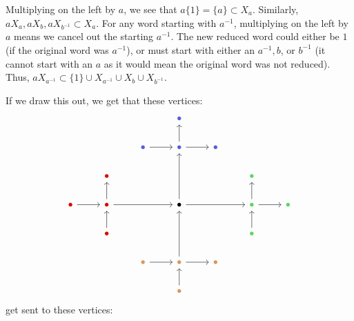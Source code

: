Multiplying on the left by $a$, we see that $a\{1\} = \{a\} \subset X_a$. Similarly, $aX_a, aX_b, aX_{b^{-1}} \subset X_a$. For any word starting with $a^{-1}$, multiplying on the left by $a$ means we cancel out the starting $a^{-1}$. The new reduced word could either be $1$ (if the original word was $a^{-1}$), or must start with either an $a^{-1}, b$, or $b^{-1}$ (it cannot start with an $a$ as it would mean the original word was not reduced). Thus, $aX_{a^{-1}} \subset \{1\} \cup X_{a^{-1}} \cup X_b \cup X_{b^{-1}}$. 

If we draw this out, we get that these vertices: 
\[\begin{tikzcd}
	&&& \textcolor{rgb,255:red,92;green,92;blue,214}{\bullet} &&& \\
	&& \textcolor{rgb,255:red,92;green,92;blue,214}{\bullet} & \textcolor{rgb,255:red,92;green,92;blue,214}{\bullet} & \textcolor{rgb,255:red,92;green,92;blue,214}{\bullet} \\
	& \textcolor{rgb,255:red,224;green,7;blue,0}{\bullet} &&&& \textcolor{rgb,255:red,92;green,214;blue,92}{\bullet} \\
	\textcolor{rgb,255:red,224;green,7;blue,0}{\bullet} & \textcolor{rgb,255:red,224;green,7;blue,0}{\bullet} && \bullet && \textcolor{rgb,255:red,92;green,214;blue,92}{\bullet} & \textcolor{rgb,255:red,92;green,214;blue,92}{\bullet} \\
	& \textcolor{rgb,255:red,224;green,7;blue,0}{\bullet} &&&& \textcolor{rgb,255:red,92;green,214;blue,92}{\bullet} \\
	&& \textcolor{rgb,255:red,214;green,153;blue,92}{\bullet} & \textcolor{rgb,255:red,214;green,153;blue,92}{\bullet} & \textcolor{rgb,255:red,214;green,153;blue,92}{\bullet} \\
	&&& \textcolor{rgb,255:red,214;green,153;blue,92}{\bullet}
	\arrow[from=2-3, to=2-4]
	\arrow[from=2-4, to=1-4]
	\arrow[from=2-4, to=2-5]
	\arrow[from=4-1, to=4-2]
	\arrow[from=4-2, to=3-2]
	\arrow[from=4-2, to=4-4]
	\arrow[from=4-4, to=2-4]
	\arrow[from=4-4, to=4-6]
	\arrow[from=4-6, to=3-6]
	\arrow[from=4-6, to=4-7]
	\arrow[from=5-2, to=4-2]
	\arrow[from=5-6, to=4-6]
	\arrow[from=6-3, to=6-4]
	\arrow[from=6-4, to=4-4]
	\arrow[from=6-4, to=6-5]
	\arrow[from=7-4, to=6-4]
\end{tikzcd}\]
get sent to these vertices:
